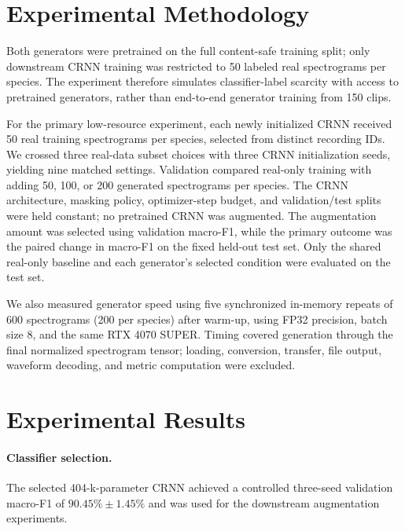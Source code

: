 \documentclass{article}
\begin{document}
\section{Experimental Methodology}

Both generators were pretrained on the full content-safe training split; only
downstream CRNN training was restricted to 50 labeled real spectrograms per
species. The experiment therefore simulates classifier-label scarcity with
access to pretrained generators, rather than end-to-end generator training
from 150 clips.

For the primary low-resource experiment, each newly initialized CRNN received
50 real training spectrograms per species, selected from distinct recording
IDs. We crossed three real-data subset choices with three CRNN initialization
seeds, yielding nine matched settings. Validation compared real-only training
with adding 50, 100, or 200 generated spectrograms per species. The CRNN
architecture, masking policy, optimizer-step budget, and validation/test splits
were held constant; no pretrained CRNN was augmented. The augmentation amount
was selected using validation macro-F1, while the primary outcome was the
paired change in macro-F1 on the fixed held-out test set. Only the shared
real-only baseline and each generator's selected condition were evaluated on
the test set.

We also measured generator speed using five synchronized in-memory repeats of
600 spectrograms (200 per species) after warm-up, using FP32 precision, batch
size 8, and the same RTX 4070 SUPER. Timing covered generation through the
final normalized spectrogram tensor; loading, conversion, transfer, file
output, waveform decoding, and metric computation were excluded.

\section{Experimental Results}

\paragraph{Classifier selection.}
The selected 404-k-parameter CRNN achieved a controlled three-seed validation
macro-F1 of $90.45\%\pm1.45\%$ and was used for the downstream augmentation
experiments.
\end{document}
